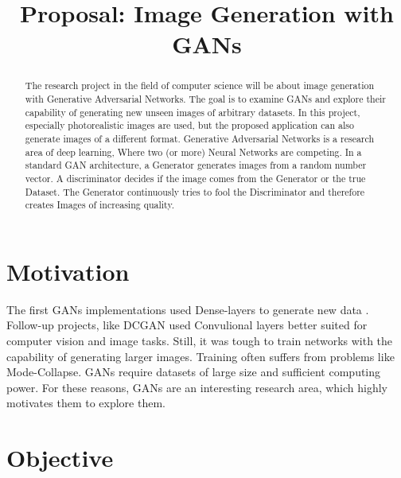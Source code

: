 \documentclass[conference,onecolumn,compsoc]{IEEEtran}
\begin{document}
\title{Proposal: Image Generation with GANs}

\author{
}
\maketitle

\begin{abstract}

\noindent
The research project in the field of computer science will be about image generation with Generative Adversarial
Networks. The goal is to examine GANs and explore their capability of generating new unseen images of arbitrary
datasets. In this project, especially photorealistic images are used, but the proposed application can also generate
images of a different format. Generative Adversarial Networks is a research area of deep learning, Where two (or more)
Neural Networks are competing. In a standard GAN architecture, a Generator generates images from a random number
vector. A discriminator decides if the image comes from the Generator or the true Dataset. The Generator continuously
tries to fool the Discriminator and therefore creates Images of increasing quality.

\end{abstract}


\section{Motivation}

\noindent
The first GANs implementations used Dense-layers to generate new data \cite{goodfellow2014generative}. Follow-up
projects, like DCGAN \cite{radford2016unsupervised} used Convulional layers better suited for computer vision and
image tasks. Still, it was tough to train networks with the capability of generating larger images. Training often
suffers from problems like Mode-Collapse. GANs require datasets of large size and sufficient computing power. For
these reasons, GANs are an interesting research area, which highly motivates them to explore them.


\section{Objective}
\end{document}

